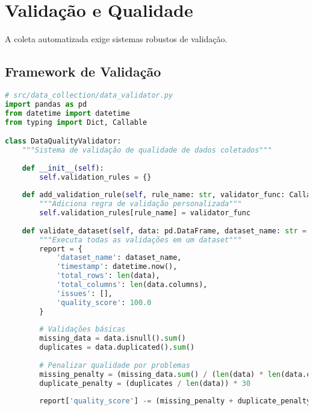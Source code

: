 \section{Validação e Qualidade}

A coleta automatizada exige sistemas robustos de validação.

\subsection{Framework de Validação}

\begin{pythonbox}
\begin{lstlisting}[language=Python]
# src/data_collection/data_validator.py
import pandas as pd
from datetime import datetime
from typing import Dict, Callable

class DataQualityValidator:
    """Sistema de validação de qualidade de dados coletados"""
    
    def __init__(self):
        self.validation_rules = {}
        
    def add_validation_rule(self, rule_name: str, validator_func: Callable):
        """Adiciona regra de validação personalizada"""
        self.validation_rules[rule_name] = validator_func
        
    def validate_dataset(self, data: pd.DataFrame, dataset_name: str = "unnamed") -> Dict:
        """Executa todas as validações em um dataset"""
        report = {
            'dataset_name': dataset_name,
            'timestamp': datetime.now(),
            'total_rows': len(data),
            'total_columns': len(data.columns),
            'issues': [],
            'quality_score': 100.0
        }
        
        # Validações básicas
        missing_data = data.isnull().sum()
        duplicates = data.duplicated().sum()
        
        # Penalizar qualidade por problemas
        missing_penalty = (missing_data.sum() / (len(data) * len(data.columns))) * 50
        duplicate_penalty = (duplicates / len(data)) * 30
        
        report['quality_score'] -= (missing_penalty + duplicate_penalty)

\end{lstlisting}
\end{pythonbox}

